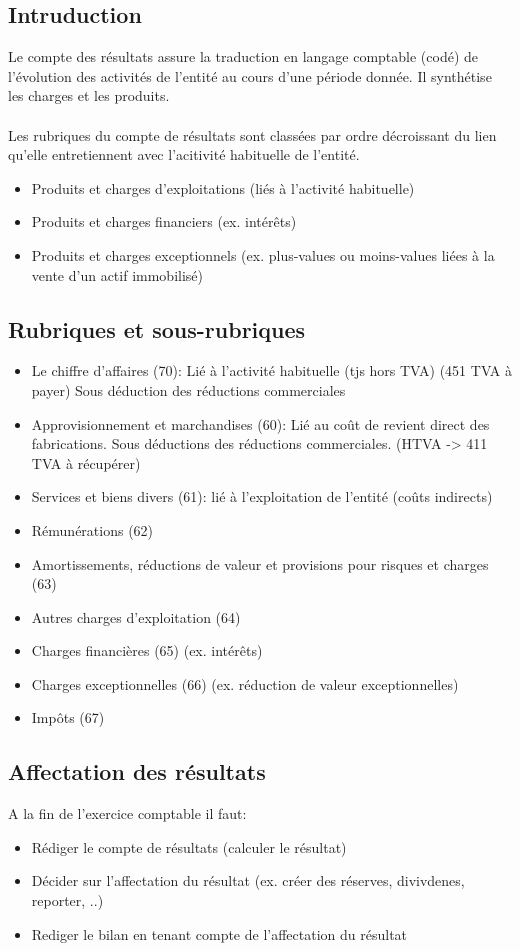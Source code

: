 \documentclass{article}
\begin{document}
\subsection{Intruduction}
Le compte des résultats assure la traduction en langage comptable (codé) de l'évolution des activités de l'entité au cours d'une période donnée. Il synthétise les charges et les produits.  \\ 
\\
Les rubriques du compte de résultats sont classées par ordre décroissant du lien qu'elle entretiennent avec l'acitivité habituelle de l'entité. 
\begin{itemize}
    \item Produits et charges d'exploitations (liés à l'activité habituelle)
    \item Produits et charges financiers (ex. intérêts)
    \item Produits et charges exceptionnels (ex. plus-values ou moins-values liées à la vente d'un actif immobilisé)
\end{itemize}
\subsection{Rubriques et sous-rubriques}
\begin{itemize}
    \item Le chiffre d'affaires (70): Lié à l'activité habituelle (tjs hors TVA) (451 TVA à payer) Sous déduction des réductions commerciales
    \item Approvisionnement et marchandises (60): Lié au coût de revient direct des fabrications. Sous déductions des réductions commerciales. (HTVA -> 411 TVA à récupérer)
    \item Services et biens divers (61): lié à l'exploitation de l'entité (coûts indirects)
    \item Rémunérations (62)
    \item Amortissements, réductions de valeur et provisions pour risques et charges (63) 
    \item Autres charges d'exploitation (64)
    \item Charges financières (65) (ex. intérêts)
    \item Charges exceptionnelles (66) (ex. réduction de valeur exceptionnelles)
    \item Impôts (67)
\end{itemize}
\subsection{Affectation des résultats}
A la fin de l'exercice comptable il faut:
\begin{itemize}
    \item Rédiger le compte de résultats (calculer le résultat)
    \item Décider sur l'affectation du résultat (ex. créer des réserves, divivdenes, reporter, ..)
    \item Rediger le bilan en tenant compte de l'affectation du résultat
\end{itemize}
\end{document}
